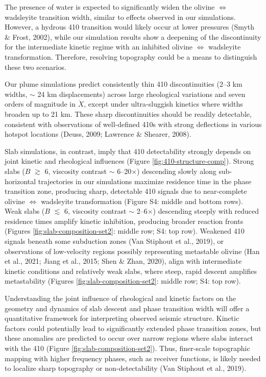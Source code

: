 \documentclass[draft,linenumbers]{agujournal2019}
\begin{document}
The presence of water is expected to significantly widen the olivine
\(\Leftrightarrow\) wadsleyite transition width, similar to effects
observed in our simulations. However, a hydrous 410 transition would
likely occur at lower pressures (Smyth \& Frost, 2002), while our
simulation results show a deepening of the discontinuity for the
intermediate kinetic regime with an inhibited olivine
\(\Leftrightarrow\) wadsleyite transformation. Therefore, resolving
topography could be a means to distinguish these two scenarios.

Our plume simulations predict consistently thin 410 discontinuities
(2--3 km widths, \(\sim\) 24 km displacements) across large rheological
variations and seven orders of magnitude in \(\dot{X}\), except under
ultra-sluggish kinetics where widths broaden up to 21 km. These sharp
discontinuities should be readily detectable, consistent with
observations of well-defined 410s with strong deflections in various
hotspot locations (Deuss, 2009; Lawrence \& Shearer, 2008).

Slab simulations, in contrast, imply that 410 detectability strongly
depends on joint kinetic and rheological influences (Figure
\ref{fig:410-structure-comp}). Strong slabs (\(B\) \(\gtrsim\) 6,
viscosity contrast \(\sim\) 6--20\(\times\)) descending slowly along
sub-horizontal trajectories in our simulations maximize residence time
in the phase transition zone, producing sharp, detectable 410 signals
due to near-complete olivine \(\Leftrightarrow\) wadsleyite
transformation (Figure S4: middle and bottom rows). Weak slabs (\(B\)
\(\lesssim\) 6, viscosity contrast \(\sim\) 2--6\(\times\)) descending
steeply with reduced residence times amplify kinetic inhibition,
producing broader reaction fronts (Figures
\ref{fig:slab-composition-set2}: middle row; S4: top row). Weakened 410
signals beneath some subduction zones (Van Stiphout et al., 2019), or
observations of low-velocity regions possibly representing metastable
olivine (Han et al., 2021; Jiang et al., 2015; Shen \& Zhan, 2020),
align with intermediate kinetic conditions and relatively weak slabs,
where steep, rapid descent amplifies metastability (Figures
\ref{fig:slab-composition-set2}: middle row; S4: top row).

Understanding the joint influence of rheological and kinetic factors on
the geometry and dynamics of slab descent and phase transition width
will offer a quantitative framework for interpreting observed seismic
structure. Kinetic factors could potentially lead to significantly
extended phase transition zones, but these anomalies are predicted to
occur over narrow regions where slabs interact with the 410 (Figure
\ref{fig:slab-composition-set2}). Thus, finer-scale topographic mapping
with higher frequency phases, such as receiver functions, is likely
needed to localize sharp topography or non-detectability (Van Stiphout
et al., 2019).
\end{document}
